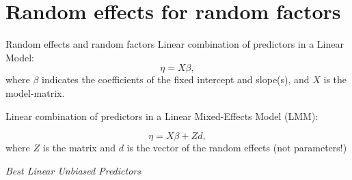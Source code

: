 \documentclass[compress]{beamer}
\begin{document}
\section{Random effects for random factors}

\begin{frame}{Random effects and random factors}
	Linear combination of predictors in a Linear Model: 
	\begin{equation*}
		\eta = X \beta,
	\end{equation*}
	where $\beta$ indicates the coefficients of the fixed intercept and slope(s), and $X$ is the model-matrix.
	
	\pause
Linear combination of predictors in a Linear Mixed-Effects Model (LMM): 
	
	\begin{equation*}
		\eta = X \beta + Zd,
	\end{equation*}
	where $Z$ is the matrix and $d$ is the vector of the random effects (not parameters!)
	
	
	\vspace{2.5mm}
	\begin{center}
		\emph{Best Linear Unbiased Predictors}
	\end{center}
\end{frame}
\end{document}
